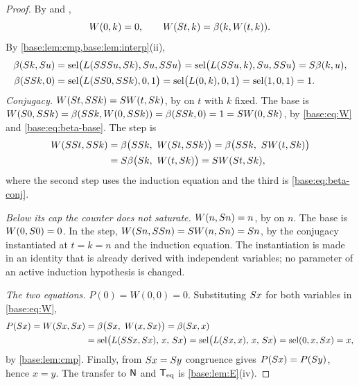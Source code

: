 \begin{proof}
By  and ,
\begin{equation}
 W(0,k)=0,\qquad W(S t,k)=\beta(k,W(t,k)). \label{base:eq:W}
\end{equation}
By \cref{base:lem:cmp,base:lem:interp}(ii),
\begin{align}
 \beta(S k,S u)
 &=\operatorname{sel}\bigl(L(SSS u,S k),S u,SS u\bigr)
  =\operatorname{sel}\bigl(L(SS u,k),S u,SS u\bigr)
  =S\beta(k,u), \label{base:eq:beta-conj}\\
 \beta(SS k,0)
 &=\operatorname{sel}\bigl(L(SS 0,SS k),0,1\bigr)
  =\operatorname{sel}\bigl(L(0,k),0,1\bigr)=\operatorname{sel}(1,0,1)=1. \label{base:eq:beta-base}
\end{align}
\emph{Conjugacy.}  $W(S t,SS k)=S W(t,S k)$, by 
on $t$ with $k$ fixed.  The base is
$W(S 0,SS k)=\beta(SS k,W(0,SS k))
 =\beta(SS k,0)=1=S W(0,S k)$, by \eqref{base:eq:W} and
\eqref{base:eq:beta-base}.  The step is
\begin{align*}
 W(SS t,SS k)
 &=\beta\bigl(SS k,\ W(S t,SS k)\bigr)
  =\beta\bigl(SS k,\ S W(t,S k)\bigr)\\
 &=S\beta\bigl(S k,\ W(t,S k)\bigr)=S W(S t,S k),
\end{align*}
where the second step uses the induction equation and the third is
\eqref{base:eq:beta-conj}.

\emph{Below its cap the counter does not saturate.}  $W(n,S n)=n$, by
 on $n$.  The base is $W(0,S 0)=0$.  In the step,
$W(S n,SS n)=S W(n,S n)=S n$, by the conjugacy
instantiated at $t=k=n$ and the induction equation.  The instantiation is
made in an identity that is already derived with independent variables; no
parameter of an active induction hypothesis is changed.

\emph{The two equations.}  $P(0)=W(0,0)=0$.  Substituting $S x$ for both
variables in \eqref{base:eq:W},
\begin{align*}
 P(S x)=W(S x,S x)
 &=\beta\bigl(S x,\ W(x,S x)\bigr)=\beta(S x,x)\\
 &=\operatorname{sel}\bigl(L(SS x,S x),\,x,\,S x\bigr)
  =\operatorname{sel}\bigl(L(S x,x),\,x,\,S x\bigr)=\operatorname{sel}(0,x,S x)=x,
\end{align*}
by \cref{base:lem:cmp}.  Finally, from $S x=S y$ congruence gives
$P(S x)=P(S y)$, hence $x=y$.  The transfer to $\mathsf{N}$ and $\mathsf{T}_{\mathrm{eq}}$ is
\cref{base:lem:E}(iv).
\end{proof}


